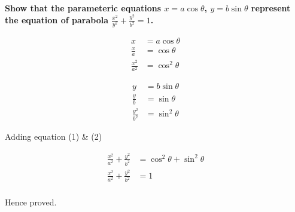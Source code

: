\documentclass[crop=false,fleqn]{standalone}
\begin{document}
    \textbf{
        Show that the parameteric equations $x=a\cos\theta$, $y=b\sin\theta$
        represent the equation of parabola $\frac{x^2}{y^2}+\frac{y^2}{b^2}=1$.
    }

    \begin{multicols}{2}
        \begin{align*}
            x &= a\cos\theta \\
            \frac{x}{a} &= \cos\theta \\
            \frac{x^2}{a^2} &= \cos^2\theta \tag{1}
        \end{align*}

        \begin{align*}
            y &= b\sin\theta \\
            \frac{y}{b} &= \sin\theta \\
            \frac{y^2}{b^2} &= \sin^2\theta  \tag{2}
        \end{align*}
    \end{multicols}

    Adding equation (1) \& (2)

    \begin{align*}
        \frac{x^2}{a^2} + \frac{y^2}{b^2} &= \cos^2\theta + \sin^2\theta \\
        \frac{x^2}{a^2} + \frac{y^2}{b^2} &= 1 \\
    \end{align*}

    Hence proved.
\end{document}
